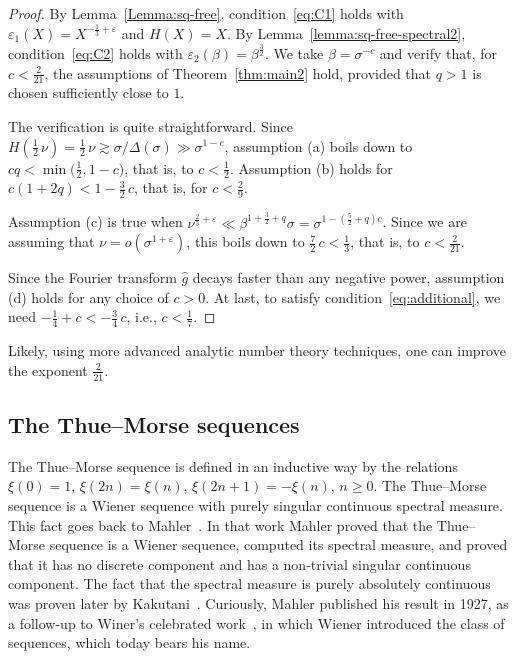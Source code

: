 \documentclass[11pt]{amsart}
\numberwithin{equation}{section}
\def\ep{{\varepsilon}}
\begin{document}
\begin{proof}
By Lemma~\ref{Lemma:sq-free}, condition~\eqref{eq:C1} holds with
$\ep_1 (X) = X^{-\frac13+\ep}$ and $H(X)=X$.
By Lemma~\ref{lemma:sq-free-spectral2},
condition~\eqref{eq:C2} holds with $\ep_2 (\beta) = \beta^{\frac32}$.
We take $\beta=\sigma^{-c}$ and verify that, for $c<\tfrac2{21}$,
the assumptions of Theorem~\ref{thm:main2} hold, provided that $q>1$ is
chosen sufficiently close to $1$.

The verification is quite straightforward.
Since $H(\tfrac12\, \nu) = \tfrac12\, \nu \gtrsim \sigma/\Delta(\sigma) \gg \sigma^{1-c}$,
assumption (a) boils down to $cq < \min\bigl( \tfrac12, 1-c\bigr)$, that is, to $c<\tfrac12$.
Assumption (b) holds for $c(1+2q) < 1 - \tfrac32\, c$, that is, for $c<\tfrac29$.

Assumption (c) is true when $\nu^{\frac23+\ep} \ll \beta^{1+\frac32+q}\sigma =
\sigma^{1-(\frac52+q)c}$. Since we are assuming that $\nu = o(\sigma^{1+\ep})$,
this boils down to $\tfrac72\, c < \tfrac13$, that is, to $c<\tfrac2{21}$.

Since the Fourier transform $\widehat{g}$ decays faster than
any negative power, assumption (d) holds for any choice of $c>0$.
At last, to satisfy condition~\eqref{eq:additional}, we need $-\tfrac14 + c < - \tfrac34\, c$,
i.e., $c<\tfrac1{7}$.
\end{proof}

Likely, using more advanced analytic number theory techniques, one can improve
the exponent $\tfrac2{21}$.

\subsection{The Thue--Morse sequences}
The Thue--Morse sequence is defined in an inductive way by the relations $\xi(0)=1$, $\xi(2n)=\xi(n)$, $\xi(2n+1)=-\xi(n)$, $n\ge 0$. The Thue--Morse sequence is a Wiener sequence with
purely singular continuous spectral measure. This fact goes back to Mahler~\cite{Mahler}. In that work Mahler proved that 
the Thue--Morse sequence is a Wiener sequence, computed its spectral measure, and
proved that it has no discrete component and has a non-trivial singular continuous component. The fact that the spectral measure is purely absolutely continuous was proven later by Kakutani~\cite{Kakutani}.
Curiously, Mahler published his result in 1927, as a follow-up to Winer's celebrated work~\cite{Wiener}, in which Wiener introduced the class of sequences, which today bears his name.
\end{document}
